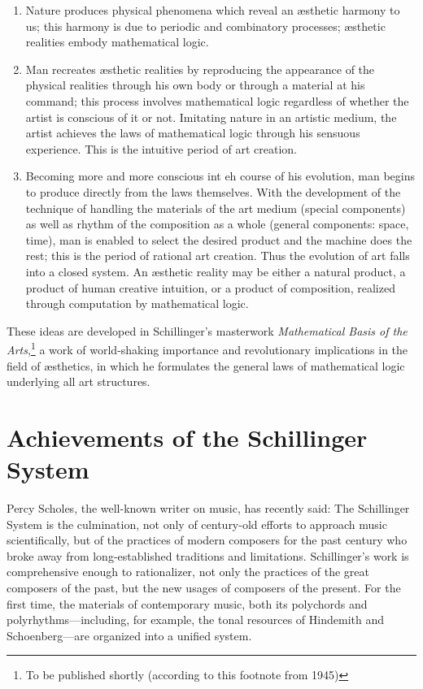 \begin{enumerate}
	\item Nature produces physical phenomena which reveal an \ae sthetic harmony to us; this harmony is due to periodic and combinatory processes; \ae sthetic realities embody mathematical logic.
	\item Man recreates \ae sthetic realities by reproducing the appearance of the physical realities through his own body or through a material at his command; this process involves mathematical logic regardless of whether the artist is conscious of it or not. Imitating nature in an artistic medium, the artist achieves the laws of mathematical logic through his sensuous experience. This is the intuitive period of art creation.
	\item Becoming more and more conscious int eh course of his evolution,
man begins to produce directly from the laws themselves. With the development
of the technique of handling the materials of the art medium (special
components) as well as rhythm of the composition as a whole (general
components: space, time), man is enabled to select the desired product and the
machine does the rest; this is the period of rational art creation. Thus the
evolution of art falls into a closed system. An \ae sthetic reality may be
either a natural product, a product of human creative intuition, or a product
of composition, realized through computation by mathematical logic.
\end{enumerate}

These ideas are developed in Schillinger's masterwork \textit{Mathematical
Basis of the Arts},\footnote{To be published shortly (according to this
footnote from 1945)} a work of world-shaking importance and revolutionary
implications in the field of \ae sthetics, in which he formulates the general
laws of mathematical logic underlying all art structures.

\section{Achievements of the Schillinger System}

Percy Scholes, the well-known writer on music, has recently said:  The Schillinger
System is the culmination, not only of century-old efforts to approach music
scientifically, but of the practices of modern composers for the past century
who broke away from long-established traditions and limitations. Schillinger's
work is comprehensive enough to rationalizer, not only the practices of the
great composers of the past, but the new usages of composers of the present.
For the first time, the materials of contemporary music, both its polychords
and polyrhythms---including, for example, the tonal resources of Hindemith and
Schoenberg---are organized into a unified system.

